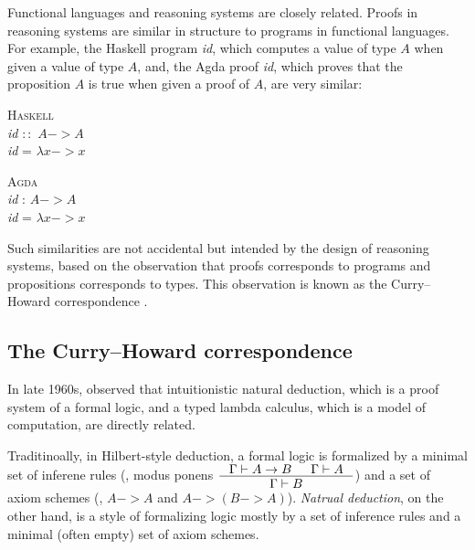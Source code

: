 Functional languages and reasoning systems are closely related.
Proofs in reasoning systems are similar in structure to programs
in functional languages. For example, the Haskell program \textit{id},
which computes a value of type $A$ when given a value of type $A$,
and, the Agda proof \textit{id}, which proves that the proposition $A$
is true when given a proof of $A$, are very similar:
\begin{center}
\begin{singlespace}
\begin{minipage}{.4\linewidth}
	\textsc{Haskell} \vspace*{.5em} \\
\textit{id} $::$ $A -> A$ \\
\textit{id} = $\lambda x -> x$
\end{minipage}
\begin{minipage}{.4\linewidth}
	\textsc{Agda}  \vspace*{.5em} \\
\textit{id} : $A -> A$ \\
\textit{id} = $\lambda x -> x$
\end{minipage}
\end{singlespace}
\end{center}\vspace*{.5em}
Such similarities are not accidental but intended by the design of
reasoning systems, based on the observation that proofs corresponds
to programs and propositions corresponds to types. This observation
is known as the Curry--Howard correspondence \cite{Howard69}.

\subsection*{The Curry--Howard correspondence}
In late 1960s, \citet{Howard69} observed that intuitionistic natural deduction,
which is a proof system of a formal logic, and a typed lambda calculus,
which is a model of computation, are directly related.

Traditinoally, in Hilbert-style deduction, a formal logic is formalized
by a minimal set of inferene rules (\eg, modus ponens
$\inference{\Gamma |- A -> B & \Gamma |- A}{\Gamma |- B}$)
and a set of axiom schemes (\eg, $A -> A$ and $A -> (B -> A)$).
\emph{Natrual deduction}, on the other hand, is a style of formalizing logic
mostly by a set of inference rules and a minimal (often empty) set of
axiom schemes.

